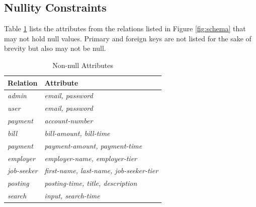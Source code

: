 \documentclass{article}
\begin{document}
        \subsection{Nullity Constraints}
            Table \ref{tab:non_null} lists the attributes from the relations listed in Figure \ref{fig:schema} that may
            not hold null values. Primary and foreign keys are not listed for the sake of brevity but also may not be
            null. \par
            \begin{table}[h]
                \centering
                \begin{tabular}{|l|l|}
                    \hline
                    \textbf{Relation}   & \textbf{Attribute}                              \\ \hline
                    \textit{admin}      & \textit{email, password}                        \\ \hline
                    \textit{user}       & \textit{email, password}                        \\ \hline
                    \textit{payment}    & \textit{account-number}                         \\ \hline
                    \textit{bill}       & \textit{bill-amount, bill-time}                 \\ \hline
                    \textit{payment}    & \textit{payment-amount, payment-time}           \\ \hline
                    \textit{employer}   & \textit{employer-name, employer-tier}           \\ \hline
                    \textit{job-seeker} & \textit{first-name, last-name, job-seeker-tier} \\ \hline
                    \textit{posting}    & \textit{posting-time, title, description}       \\ \hline
                    \textit{search}     & \textit{input, search-time}                     \\ \hline
                \end{tabular}
                \caption{Non-null Attributes}
                \label{tab:non_null}
            \end{table}
\end{document}
